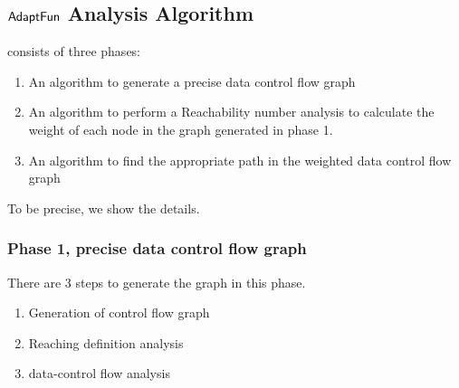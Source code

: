 \subsection{ $\textsf{AdaptFun}$ Analysis Algorithm}
{\THESYSTEM} consists of three phases: 
\begin{enumerate}
    \item An algorithm to generate a precise data control flow graph
    \item An algorithm to perform a Reachability number analysis to calculate the weight of each node in the graph generated in phase 1.
    \item An algorithm to find the appropriate path in the weighted data control flow graph
\end{enumerate}

To be precise, we show the details. 
\subsubsection{Phase 1, precise data control flow graph}
There are 3 steps to generate the graph in this phase.
\begin{enumerate}
\item Generation of control flow graph
    \item Reaching definition analysis
   \item  data-control flow analysis
\end{enumerate}

